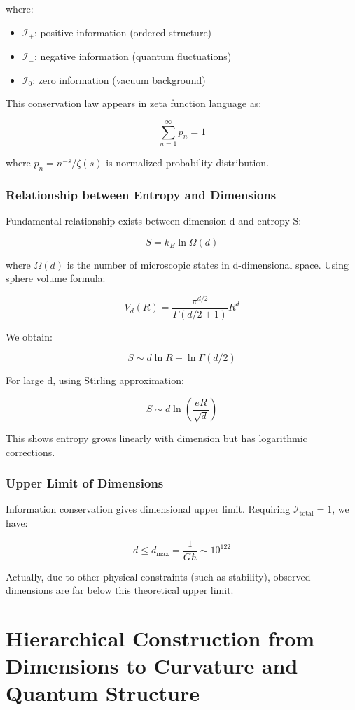 \documentclass[12pt,a4paper]{article}
\begin{document}
where:
\begin{itemize}
\item $\mathcal{I}_+$: positive information (ordered structure)
\item $\mathcal{I}_-$: negative information (quantum fluctuations)
\item $\mathcal{I}_0$: zero information (vacuum background)
\end{itemize}

This conservation law appears in zeta function language as:

$$\sum_{n=1}^{\infty} p_n = 1$$

where $p_n = n^{-s}/\zeta(s)$ is normalized probability distribution.

\subsubsection{Relationship between Entropy and Dimensions}

Fundamental relationship exists between dimension d and entropy S:

$$S = k_B \ln \Omega(d)$$

where $\Omega(d)$ is the number of microscopic states in d-dimensional space. Using sphere volume formula:

$$V_d(R) = \frac{\pi^{d/2}}{\Gamma(d/2 + 1)} R^d$$

We obtain:

$$S \sim d \ln R - \ln \Gamma(d/2)$$

For large d, using Stirling approximation:

$$S \sim d \ln \left(\frac{eR}{\sqrt{d}}\right)$$

This shows entropy grows linearly with dimension but has logarithmic corrections.

\subsubsection{Upper Limit of Dimensions}

Information conservation gives dimensional upper limit. Requiring $\mathcal{I}_{\text{total}} = 1$, we have:

$$d \leq d_{\max} = \frac{1}{G\hbar} \sim 10^{122}$$

Actually, due to other physical constraints (such as stability), observed dimensions are far below this theoretical upper limit.

\section{Hierarchical Construction from Dimensions to Curvature and Quantum Structure}
\end{document}
